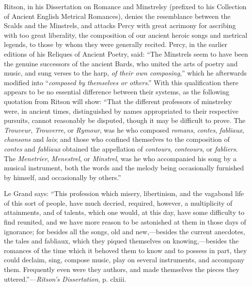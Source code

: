 Ritson, in his Dissertation on Romance and Minstrelsy (prefixed to his Collection
of Ancient English Metrical Romances), denies the resemblance between
the Scalds and the Minstrels, and attacks Percy with great acrimony for ascribing
with too great liberality, the composition of our ancient heroic songs
and metrical legends, to those by whom they were generally recited. Percy,
in the earlier editions of his Reliques of Ancient Poetry, said: “The Minstrels
seem to have been the genuine successors of the ancient Bards, who united the
arts of poetry and music, and sung verses to the harp, \textit{of their own composing},”
which he afterwards modified into “\textit{composed by themselves or others}.” With this
qualification there appears to be no essential difference between their systems, as
the following quotation from Ritson will show: “That the different professors of
minstrelsy were, in ancient times, distinguished by names appropriated to their
respective pursuits, cannot reasonably be disputed, though it may be difficult to
prove. The \textit{Trouveur}, \textit{Trouverre}, or \textit{Rymour},
\pagebreak
was he who composed \textit{romans}, 
\textit{contes}, \textit{fabliaux}, \textit{chansons} and \textit{lais}; and those who confined themselves to the 
composition of \textit{contes} and \textit{fabliaux} obtained the appellation of \textit{contours}, \textit{conteours}, or
\textit{fabliers}. The \textit{Menetrier}, \textit{Menestrel}, or \textit{Minstrel}, was he who accompanied his song
by a musical instrument, both the words and the melody being occasionally furnished
by himself, and occasionally by others.”

Le Grand says: “This profession which misery, libertinism, and the vaga\-bond
life of this sort of people, have much decried, required, however, a multiplicity of
attainments, and of talents, which one would, at this day, have some difficulty to
find reunited, and we have more reason to be astonished at them in those days of
ignorance; for besides all the songs, old and new,—besides the current anecdotes, 
the tales and fabliaux, which they piqued themselves on knowing,—besides
the romances of the time which it behoved them to know and to possess in part, they
could declaim, sing, compose music, play on several instruments, and accompany
them. Frequently even were they authors, and made themselves the pieces
they uttered.”—\textit{Ritson’s Dissertation}, p. clxiii.

